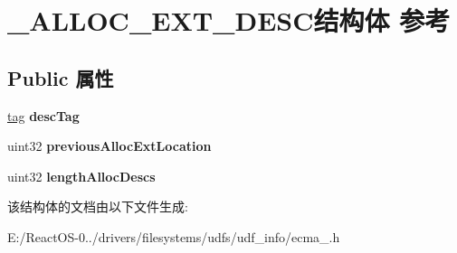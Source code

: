 \hypertarget{struct___a_l_l_o_c___e_x_t___d_e_s_c}{}\section{\+\_\+\+A\+L\+L\+O\+C\+\_\+\+E\+X\+T\+\_\+\+D\+E\+S\+C结构体 参考}
\label{struct___a_l_l_o_c___e_x_t___d_e_s_c}
\subsection*{Public 属性}
\begin{DoxyCompactItemize}
\item 
\mbox{\label{struct___a_l_l_o_c___e_x_t___d_e_s_c_a88121b271245af215525b5fac04b1cfc}} 
\hyperlink{structtag}{tag} {\bfseries desc\+Tag}
\item 
\mbox{\label{struct___a_l_l_o_c___e_x_t___d_e_s_c_af566ca15a868440e5f220d27e0e54d8f}} 
uint32 {\bfseries previous\+Alloc\+Ext\+Location}
\item 
\mbox{\label{struct___a_l_l_o_c___e_x_t___d_e_s_c_a51293426cb31caaa7a0ed611f423e1fc}} 
uint32 {\bfseries length\+Alloc\+Descs}
\end{DoxyCompactItemize}


该结构体的文档由以下文件生成\+:\begin{DoxyCompactItemize}
\item 
E\+:/\+React\+O\+S-\/0../drivers/filesystems/udfs/udf\+\_\+info/ecma\+\_.\+h\end{DoxyCompactItemize}
